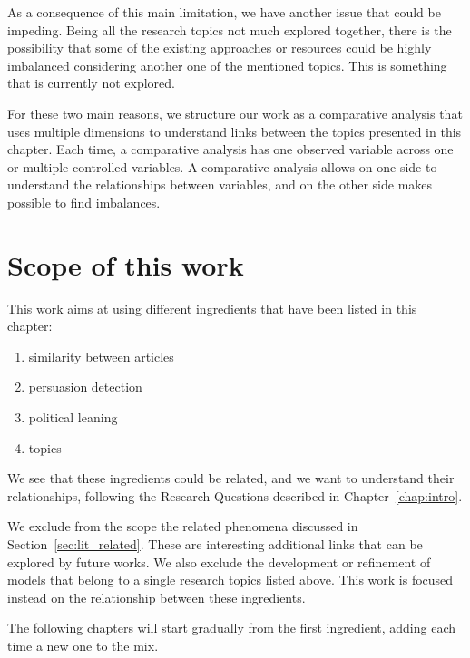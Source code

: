 




As a consequence of this main limitation, we have another issue that could be impeding.
Being all the research topics not much explored together, there is the possibility that some of the existing approaches or resources could be highly imbalanced considering another one of the mentioned topics.
This is something that is currently not explored.


For these two main reasons, we structure our work as a comparative analysis that uses multiple dimensions to understand links between the topics presented in this chapter.
Each time, a comparative analysis has one observed variable across one or multiple controlled variables.
A comparative analysis allows on one side to understand the relationships between variables, and on the other side makes possible to find imbalances.

\section{\statusgreen Scope of this work}
\label{sec:lit_scope}

This work aims at using different ingredients that have been listed in this chapter:
\begin{enumerate}
    \item similarity between articles
    \item persuasion detection
    \item political leaning
    \item topics
\end{enumerate}

We see that these ingredients could be related, and we want to understand their relationships, following the Research Questions described in Chapter~\ref{chap:intro}.

We exclude from the scope the related phenomena discussed in Section~\ref{sec:lit_related}. These are interesting additional links that can be explored by future works.
We also exclude the development or refinement of models that belong to a single research topics listed above. This work is focused instead on the relationship between these ingredients.

The following chapters will start gradually from the first ingredient, adding each time a new one to the mix. 
